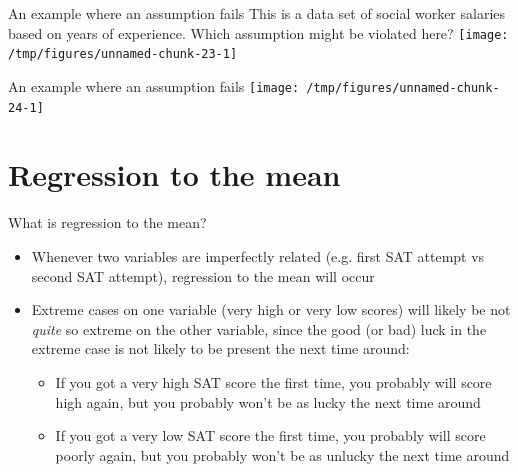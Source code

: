 \documentclass{beamer}\usepackage[]{graphicx}\usepackage[]{color}
\newenvironment{knitrout}{}{} %
\begin{document}
\begin{darkframes}
    \begin{frame}{An example where an assumption fails}
      This is a data set of social worker salaries based on years of experience. Which assumption might be violated here?
\begin{knitrout}
\color{fgcolor}
\texttt{[image: /tmp/figures/unnamed-chunk-23-1]} 

\end{knitrout}
    \end{frame}

    \begin{frame}{An example where an assumption fails}
\begin{knitrout}
\color{fgcolor}
\texttt{[image: /tmp/figures/unnamed-chunk-24-1]} 

\end{knitrout}
    \end{frame}

    \section{Regression to the mean}

    \begin{frame}
    \end{frame}
    \begin{frame}
    \end{frame}
    \begin{frame}
    \end{frame}

    \begin{frame}{What is regression to the mean?}
      \begin{itemize}[<+->]
        \item Whenever two variables are imperfectly related (e.g. first SAT attempt vs second SAT attempt), \alert{regression to the mean} will occur
        \item Extreme cases on one variable (very high or very low scores) will likely be not \emph{quite} so extreme on the other variable, since the good (or bad) luck in the extreme case is not likely to be present the next time around:
          \begin{itemize}[<+->]
            \item If you got a very high SAT score the first time, you probably will score high again, but you probably won't be as lucky the next time around
            \item If you got a very low SAT score the first time, you probably will score poorly again, but you probably won't be as unlucky the next time around
          \end{itemize}
      \end{itemize}
    \end{frame}


\end{darkframes}
\end{document}

